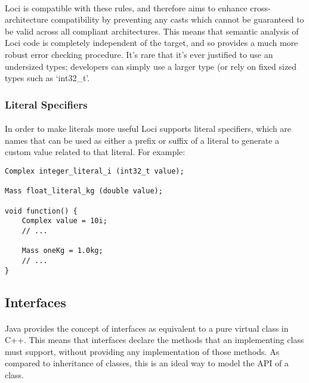 \documentclass[12pt,twoside,notitlepage]{report}
\begin{document}
\paragraph{}
Loci is compatible with these rules, and therefore aims to enhance cross-architecture compatibility by preventing any casts which cannot be guaranteed to be valid across all compliant architectures. This means that semantic analysis of Loci code is completely independent of the target, and so provides a much more robust error checking procedure. It's rare that it's ever justified to use an undersized types; developers can simply use a larger type (or rely on fixed sized types such as `int32\_t'.

\subsubsection{Literal Specifiers}

\paragraph{}
In order to make literals more useful Loci supports literal specifiers, which are names that can be used as either a prefix or suffix of a literal to generate a custom value related to that literal. For example:

\begin{lstlisting}
Complex integer_literal_i (int32_t value);

Mass float_literal_kg (double value);

void function() {
	Complex value = 10i;
	// ...
	
	Mass oneKg = 1.0kg;
	// ...
}
\end{lstlisting}

\clearpage

\subsection{Interfaces}

\paragraph{}
Java provides the concept of interfaces as equivalent to a pure virtual class in C++. This means that interfaces declare the methods that an implementing class must support, without providing any implementation of those methods. As compared to inheritance of classes, this is an ideal way to model the API of a class.
\end{document}
